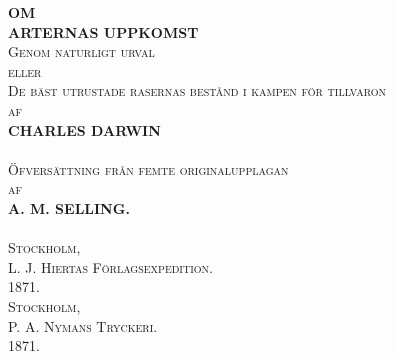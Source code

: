 \begin{titlepage}
\begin{center}

{\LARGE \bf OM \\[0.3cm]  ARTERNAS UPPKOMST}\\[0.5cm]

\textsc{\large Genom naturligt urval}\\[0.4cm]

\textsc{\normalsize eller}\\[0.5cm]

\textsc{\large De bäst utrustade rasernas bestånd
i kampen för tillvaron}\\[0.4cm]

\textsc{\normalsize af}\\[0.5cm]

{\normalsize \bf CHARLES DARWIN}\\[0.3cm]

\HRule\\[0.5cm]

\textsc{\normalsize Öfversättning från femte originalupplagan}\\[0.5cm]

\textsc{\normalsize af}\\[0.5cm]

{\normalsize \bf A. M. SELLING.}\\[0.3cm]

\HRule\\[0.5cm]

\textsc{\large Stockholm,}\\[0.2cm]

\textsc{\normalsize L. J. Hiertas Förlagsexpedition.}\\[0.2cm]
\textsc{\normalsize 1871.}\\[0.5cm]

\textsc{\large Stockholm,}\\[0.2cm]
\textsc{\large P. A. Nymans Tryckeri.}\\[0.2cm]
\textsc{\large 1871.}

\end{center}

\end{titlepage}

